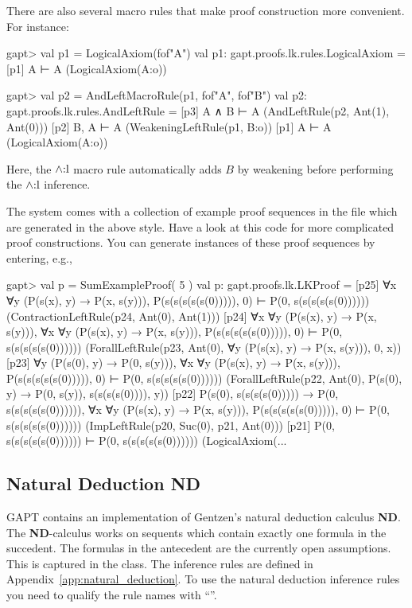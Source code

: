 \documentclass[a4paper,11pt]{book}
\renewcommand{\land}{\wedge}
\newcommand{\ND}{\textbf{ND}}
\newcommand{\mt}[1]{\textnormal{#1}}
\newcommand{\cli}[1]{{\ttfamily {#1}}}
\begin{document}
There are also several macro rules that make proof construction more convenient.
For instance:
\begin{clilisting}
gapt> val p1 = LogicalAxiom(fof"A")
val p1: gapt.proofs.lk.rules.LogicalAxiom =
[p1] A ⊢ A    (LogicalAxiom(A:o))

gapt> val p2 = AndLeftMacroRule(p1, fof"A", fof"B")
val p2: gapt.proofs.lk.rules.AndLeftRule =
[p3] A ∧ B ⊢ A    (AndLeftRule(p2, Ant(1), Ant(0)))
[p2] B, A ⊢ A    (WeakeningLeftRule(p1, B:o))
[p1] A ⊢ A    (LogicalAxiom(A:o))

\end{clilisting}
Here, the $\land\mt{:l}$ macro rule automatically adds $B$ by weakening before
performing the $\land\mt{:l}$ inference.

The system comes with a collection of example proof sequences in the file
\cli{examples/ProofSequences.scala} which are generated in the above style.
Have a look at this code for more complicated proof constructions.
You can generate instances of these proof sequences by entering, e.g.,
\begin{clilisting}
gapt> val p = SumExampleProof( 5 )
val p: gapt.proofs.lk.LKProof =
[p25] ∀x ∀y (P(s(x), y) → P(x, s(y))), P(s(s(s(s(s(0))))), 0) ⊢ P(0, s(s(s(s(s(0))))))    (ContractionLeftRule(p24, Ant(0), Ant(1)))
[p24] ∀x ∀y (P(s(x), y) → P(x, s(y))),
∀x ∀y (P(s(x), y) → P(x, s(y))),
P(s(s(s(s(s(0))))), 0)
⊢
P(0, s(s(s(s(s(0))))))    (ForallLeftRule(p23, Ant(0), ∀y (P(s(x), y) → P(x, s(y))), 0, x))
[p23] ∀y (P(s(0), y) → P(0, s(y))),
∀x ∀y (P(s(x), y) → P(x, s(y))),
P(s(s(s(s(s(0))))), 0)
⊢
P(0, s(s(s(s(s(0))))))    (ForallLeftRule(p22, Ant(0), P(s(0), y) → P(0, s(y)), s(s(s(s(0)))), y))
[p22] P(s(0), s(s(s(s(0))))) → P(0, s(s(s(s(s(0)))))),
∀x ∀y (P(s(x), y) → P(x, s(y))),
P(s(s(s(s(s(0))))), 0)
⊢
P(0, s(s(s(s(s(0))))))    (ImpLeftRule(p20, Suc(0), p21, Ant(0)))
[p21] P(0, s(s(s(s(s(0)))))) ⊢ P(0, s(s(s(s(s(0))))))    (LogicalAxiom(...

\end{clilisting}

\subsection{Natural Deduction ND}

GAPT contains an implementation of Gentzen's natural deduction calculus {\ND}.
The {\ND}-calculus works on sequents which contain exactly one formula in the succedent.
The formulas in the antecedent are the currently open assumptions. This is captured
in the \cli{NDSequent} class. The inference rules are defined in Appendix~\ref{app:natural_deduction}.
To use the natural deduction inference rules you need to qualify the rule names with ``\cli{nd.}''.
\end{document}
